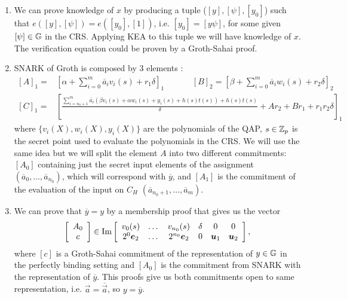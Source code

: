 \begin{enumerate}
	\item We can prove knowledge of $x$ by producing a tuple ($[y], [\psi], [y_0]$) such that $e([y],[\psi])=e([y_0],[1])$, i.e. $[y_0]=[y \psi]$, for some given $[\psi] \in \mathbb{G}$ in the CRS. Applying KEA to this tuple we will have knowledge of $x$. The verification equation could be proven by a Groth-Sahai proof.
	\item SNARK of Groth is composed by 3 elements \cite{EC:Groth16}:
	\[\begin{split}
	[A]_1 = &\left[\alpha + \sum_{i=0}^m \overline{a}_i v_i(s) + r_1 \delta\right]_1  \hspace{40pt} [B]_2 = \left[\beta + \sum_{i=0}^m \overline{a}_i w_i(s) + r_2 \delta\right]_2\\
	[C]_1 = &\left[\frac{\sum_{i=n_0+1}^m \overline{a}_i\left(\beta v_i(s)+\alpha w_i(s)+y_i(s)+h(s)t(s)\right)+h(s)t(s)}{\delta}+Ar_2+B r_1+ r_1r_2\delta \right]_1
	\end{split}\]
	where $\{v_i(X),w_i(X),y_i(X)\}$ are the polynomials of the QAP, $s\in \mathbb{Z}_p$ is the secret point used to evaluate the polynomials in the CRS.
	We will use the same idea but we will split the element $A$ into two different commitments: $[A_0]$ containing just the secret input elements of the assignment $(\overline{a}_0,\dots,\overline{a}_{n_0})$, which will correspond with $\overline{y}$, and $[A_1]$ is the commitment of the evaluation of the input on $C_H$ $(\overline{a}_{n_0+1},\dots,\overline{a}_m)$.
	\item We can prove that $\overline{y}=y$ by a membership proof that gives us the vector
	$$\left[\begin{array}{c}
	A_0\\
	c\\
	\end{array}\right] \in \text{Im}\left[\begin{array}{c c c c c c}
	v_0(s) & \dots & v_{n_0}(s) & \delta & 0 & 0 \\
	2^0\vec{e}_2 & \dots & 2^{n_0} \vec{e}_2 & 0 & \vec{u}_1 & \vec{u}_2\\
	\end{array}\right],$$
	where $[c]$ is a Groth-Sahai commitment of the representation of $y \in \mathbb{G}$ in the perfectly binding setting and $[A_0]$ is the commitment from SNARK with the representation of $\overline{y}$. This proofs give us both commitments open to same representation, i.e. $\vec{a} = \overline{\vec{a}}$, \color{red}so $y=\overline{y}$\color{black}.
\end{enumerate}


